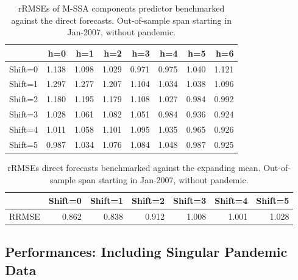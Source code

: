 \documentclass[a4paper]{article}
\begin{document}
\begin{table}[ht]
\centering
\begin{tabular}{rrrrrrrr}
  \hline
 & h=0 & h=1 & h=2 & h=3 & h=4 & h=5 & h=6 \\ 
  \hline
Shift=0 & 1.138 & 1.098 & 1.029 & 0.971 & 0.975 & 1.040 & 1.121 \\ 
  Shift=1 & 1.297 & 1.277 & 1.207 & 1.104 & 1.034 & 1.038 & 1.096 \\ 
  Shift=2 & 1.180 & 1.195 & 1.179 & 1.108 & 1.027 & 0.984 & 0.992 \\ 
  Shift=3 & 1.028 & 1.061 & 1.082 & 1.051 & 0.984 & 0.936 & 0.924 \\ 
  Shift=4 & 1.011 & 1.058 & 1.101 & 1.095 & 1.035 & 0.965 & 0.926 \\ 
  Shift=5 & 0.987 & 1.034 & 1.076 & 1.084 & 1.048 & 0.987 & 0.925 \\ 
   \hline
\end{tabular}
\caption{rRMSEs of M-SSA components predictor benchmarked against the direct forecasts. Out-of-sample span starting in Jan-2007, without pandemic.} 
\label{rRMSE_mSSA_comp_direct_without_covid7}
\end{table}%
\begin{table}[ht]
\centering
\begin{tabular}{rrrrrrr}
  \hline
 & Shift=0 & Shift=1 & Shift=2 & Shift=3 & Shift=4 & Shift=5 \\ 
  \hline
RRMSE & 0.862 & 0.838 & 0.912 & 1.008 & 1.001 & 1.028 \\ 
   \hline
\end{tabular}
\caption{rRMSEs direct forecasts benchmarked against the expanding mean. Out-of-sample span starting in Jan-2007, without pandemic.} 
\label{rRMSE_mSSA_direct_mean_without_covid8}
\end{table}

\newpage
\subsection{Performances: Including Singular Pandemic Data}
\end{document}
